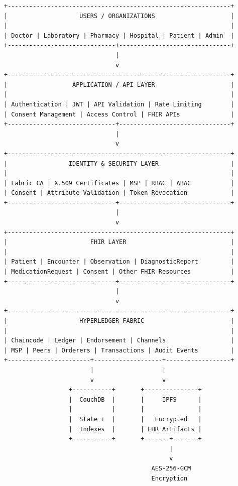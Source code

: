 \documentclass[11pt,a4paper]{article}
\begin{document}
\begin{lstlisting}
+--------------------------------------------------------------+
|                    USERS / ORGANIZATIONS                     |
|                                                              |
| Doctor | Laboratory | Pharmacy | Hospital | Patient | Admin  |
+------------------------------+-------------------------------+
                               |
                               v
+--------------------------------------------------------------+
|                  APPLICATION / API LAYER                     |
|                                                              |
| Authentication | JWT | API Validation | Rate Limiting        |
| Consent Management | Access Control | FHIR APIs              |
+------------------------------+-------------------------------+
                               |
                               v
+--------------------------------------------------------------+
|                 IDENTITY & SECURITY LAYER                    |
|                                                              |
| Fabric CA | X.509 Certificates | MSP | RBAC | ABAC           |
| Consent | Attribute Validation | Token Revocation            |
+------------------------------+-------------------------------+
                               |
                               v
+--------------------------------------------------------------+
|                       FHIR LAYER                             |
|                                                              |
| Patient | Encounter | Observation | DiagnosticReport         |
| MedicationRequest | Consent | Other FHIR Resources           |
+------------------------------+-------------------------------+
                               |
                               v
+--------------------------------------------------------------+
|                    HYPERLEDGER FABRIC                        |
|                                                              |
| Chaincode | Ledger | Endorsement | Channels                  |
| MSP | Peers | Orderers | Transactions | Audit Events         |
+-----------------------+-------------------+------------------+
                        |                   |
                        v                   v
                  +-----------+       +---------------+
                  |  CouchDB  |       |     IPFS      |
                  |           |       |               |
                  |  State +  |       |   Encrypted   |
                  |  Indexes  |       | EHR Artifacts |
                  +-----------+       +-------+-------+
                                              |
                                              v
                                         AES-256-GCM
                                         Encryption


\end{lstlisting}
\end{document}
